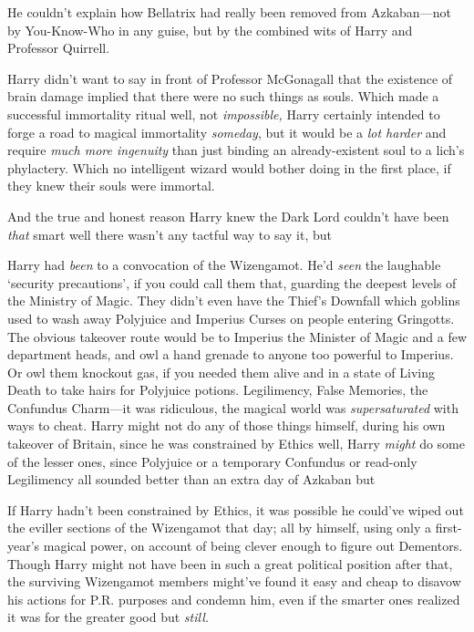 He couldn't explain how Bellatrix had really been removed from Azkaban—not by
You-Know-Who in any guise, but by the combined wits of Harry and Professor
Quirrell.

Harry didn't want to say in front of Professor McGonagall that the existence of
brain damage implied that there were no such things as souls. Which made a
successful immortality ritual{\el} well, not \emph{impossible,} Harry
certainly intended to forge a road to magical immortality \emph{someday}, but
it would be a \emph{lot harder} and require \emph{much more ingenuity} than
just binding an already-existent soul to a lich's phylactery. Which no
intelligent wizard would bother doing in the first place, if they knew their
souls were immortal.

And the true and honest reason Harry knew the Dark Lord couldn't have been
\emph{that} smart{\el} well{\el} there wasn't any tactful way to say it,
but{\el}

Harry had \emph{been} to a convocation of the Wizengamot. He'd \emph{seen} the
laughable `security precautions', if you could call them that, guarding the
deepest levels of the Ministry of Magic. They didn't even have the Thief's
Downfall which goblins used to wash away Polyjuice and Imperius Curses on
people entering Gringotts. The obvious takeover route would be to Imperius the
Minister of Magic and a few department heads, and owl a hand grenade to anyone
too powerful to Imperius. Or owl them knockout gas, if you needed them alive
and in a state of Living Death to take hairs for Polyjuice potions.
Legilimency, False Memories, the Confundus Charm—it was ridiculous, the
magical world was \emph{supersaturated} with ways to cheat. Harry might not do
any of those things himself, during his own takeover of Britain, since he was
constrained by Ethics{\el} well, Harry \emph{might} do some of the lesser
ones, since Polyjuice or a temporary Confundus or read-only Legilimency all
sounded better than an extra day of Azkaban{\el} but{\el}

If Harry hadn't been constrained by Ethics, it was possible he could've wiped
out the eviller sections of the Wizengamot that day; all by himself, using only
a first-year's magical power, on account of being clever enough to figure out
Dementors. Though Harry might not have been in such a great political position
after that, the surviving Wizengamot members might've found it easy and cheap
to disavow his actions for P.R. purposes and condemn him, even if the smarter
ones realized it was for the greater good{\el} but \emph{still.}

